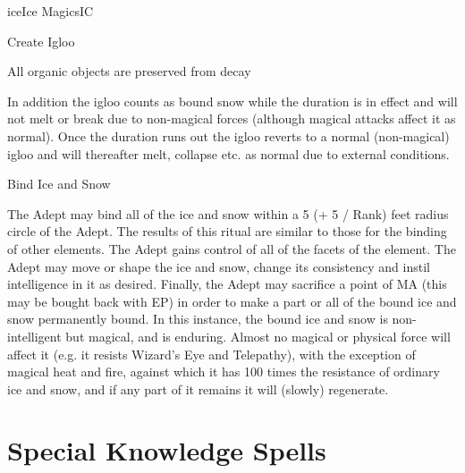 \begin{College}[1.5]{ice}{Ice Magics}{IC}
\begin{ritual}[Q-1]{Create Igloo}
\begin{effects}
\begin{Itemize}
\item All organic objects are preserved from decay
\end{Itemize}

In addition the igloo counts as bound snow while the duration is in
effect and will not melt or break due to non-magical forces (although
magical attacks affect it as normal).  Once the duration runs out
the igloo reverts to a normal (non-magical) igloo and will thereafter
melt, collapse etc.  as normal due to external conditions.
\end{effects}
\end{ritual}

\begin{ritual}[Q-2]{Bind Ice and Snow}
\begin{effects}
The Adept may bind all of the ice and snow within a 5 (+ 5 / Rank)
feet radius circle of the Adept.  The results of this ritual are
similar to those for the binding of other elements. The Adept gains
control of all of the facets of the element.  The Adept may move or
shape the ice and snow, change its consistency and instil intelligence
in it as desired.  Finally, the Adept may sacrifice a point of MA
(this may be bought back with EP) in order to make a part or all of
the bound ice and snow permanently bound. In this instance, the bound
ice and snow is non-intelligent but magical, and is enduring. Almost
no magical or physical force will affect it (e.g.  it resists Wizard’s
Eye and Telepathy), with the exception of magical heat and fire,
against which it has 100 times the resistance of ordinary ice and
snow, and if any part of it remains it will (slowly) regenerate.
\end{effects}
\end{ritual}


\section{Special Knowledge Spells}


\end{College}
